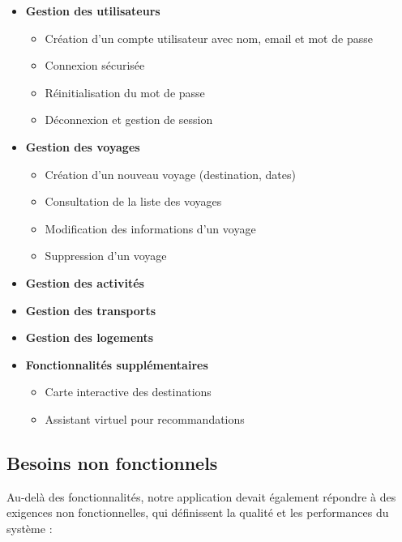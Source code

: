 \documentclass[a4paper,12pt]{article}
\begin{document}
\begin{itemize}
  \item \textbf{Gestion des utilisateurs}
  \begin{itemize}
    \item Création d'un compte utilisateur avec nom, email et mot de passe
    \item Connexion sécurisée
    \item Réinitialisation du mot de passe
    \item Déconnexion et gestion de session
  \end{itemize}

  \item \textbf{Gestion des voyages}
  \begin{itemize}
    \item Création d’un nouveau voyage (destination, dates)
    \item Consultation de la liste des voyages
    \item Modification des informations d’un voyage
    \item Suppression d’un voyage
  \end{itemize}

  \item \textbf{Gestion des activités}
  \item \textbf{Gestion des transports}
  \item \textbf{Gestion des logements}
  \item \textbf{Fonctionnalités supplémentaires}
  \begin{itemize}
    \item Carte interactive des destinations
    \item Assistant virtuel pour recommandations
  \end{itemize}
\end{itemize}


\subsection{Besoins non fonctionnels}

Au-delà des fonctionnalités, notre application devait également répondre à des exigences non fonctionnelles, qui définissent la qualité et les performances du système :
\end{document}
